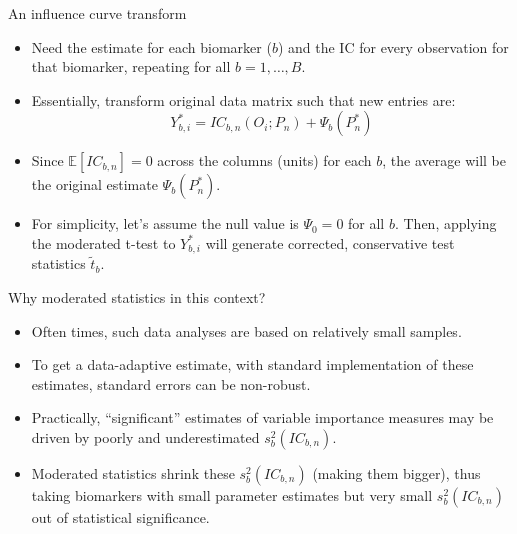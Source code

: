 \documentclass[12pt,t]{beamer}
\begin{document}
\begin{frame}[c]{An influence curve transform}

\begin{center}
\begin{itemize}
  \itemsep12pt
  \item Need the estimate for each biomarker ($b$) and the IC for every
    observation for that biomarker, repeating for all $b = 1, \dots, B$.
  \item Essentially, transform original data matrix such that new entries are:
    \[
      Y^*_{b,i} = IC_{b,n}(O_i; P_n) + \Psi_b(P_n^*)
     \]
 \item Since $\mathbb{E}[IC_{b,n}] = 0$ across the columns (units) for each $b$,
   the average will be the original estimate $\Psi_b(P_n^*)$.
  \item For simplicity, let's assume the null value is $\Psi_0 = 0$ for all $b$.
    Then, applying the moderated t-test to $Y^*_{b,i}$ will generate corrected,
    conservative test statistics $\tilde{t}_b$.
\end{itemize}
\end{center}

\end{frame}



\begin{frame}[c]{Why moderated statistics in this context?}

\begin{center}
\begin{itemize}
  \item Often times, such data analyses are based on relatively small samples.
  \item To get a data-adaptive estimate, with standard implementation of these
    estimates, standard errors can be non-robust.
\item Practically, ``significant'' estimates of variable importance measures may
  be driven by poorly and underestimated $s^2_b(IC_{b,n})$.
\item Moderated statistics shrink these $s^2_b(IC_{b,n})$ (making them bigger),
  thus taking biomarkers with small parameter estimates but very small
  $s^2_b(IC_{b,n})$ out of statistical significance.
\end{itemize}
\end{center}

\end{frame}
\end{document}
